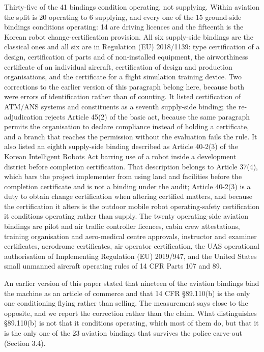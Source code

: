 Thirty-five of the 41 bindings condition operating, not supplying. Within aviation the split is 20 operating to 6 supplying, and every one of the 15 ground-side bindings conditions operating: 14 are driving licences and the fifteenth is the Korean robot change-certification provision. All six supply-side bindings are the classical ones and all six are in Regulation (EU) 2018/1139: type certification of a design, certification of parts and of non-installed equipment, the airworthiness certificate of an individual aircraft, certification of design and production organisations, and the certificate for a flight simulation training device. Two corrections to the earlier version of this paragraph belong here, because both were errors of identification rather than of counting. It listed certification of ATM/ANS systems and constituents as a seventh supply-side binding; the re-adjudication rejects Article 45(2) of the basic act, because the same paragraph permits the organisation to declare compliance instead of holding a certificate, and a branch that reaches the permission without the evaluation fails the rule. It also listed an eighth supply-side binding described as Article 40-2(3) of the Korean Intelligent Robots Act barring use of a robot inside a development district before completion certification. That description belongs to Article 37(4), which bars the project implementer from using land and facilities before the completion certificate and is not a binding under the audit; Article 40-2(3) is a duty to obtain change certification when altering certified matters, and because the certification it alters is the outdoor mobile robot operating-safety certification it conditions operating rather than supply. The twenty operating-side aviation bindings are pilot and air traffic controller licences, cabin crew attestations, training organisation and aero-medical centre approvals, instructor and examiner certificates, aerodrome certificates, air operator certification, the UAS operational authorisation of Implementing Regulation (EU) 2019/947, and the United States small unmanned aircraft operating rules of 14 CFR Parts 107 and 89.

An earlier version of this paper stated that nineteen of the aviation bindings bind the machine as an article of commerce and that 14 CFR \S{}89.110(b) is the only one conditioning flying rather than selling. The measurement says close to the opposite, and we report the correction rather than the claim. What distinguishes \S{}89.110(b) is not that it conditions operating, which most of them do, but that it is the only one of the 23 aviation bindings that survives the police carve-out (Section 3.4).


